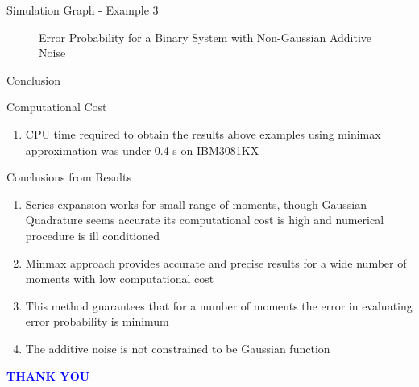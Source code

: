\documentclass{beamer}
\begin{document}
\begin{frame}{Simulation Graph - Example 3}
\begin{figure}
    \caption{Error Probability for a Binary System with Non-Gaussian Additive Noise}
    \label{fig.4}
\end{figure}
\end{frame}
\begin{frame}{Conclusion}
\begin{block}{Computational Cost}
\begin{enumerate}[]
\item CPU time required to obtain the results above examples using minimax approximation was under 
      0.4 s on IBM3081KX
\end{enumerate}
\end{block}

\begin{block}{Conclusions from Results}
\begin{enumerate}[]
\item Series expansion works for small range of moments, though Gaussian Quadrature seems accurate
      its computational cost is high and numerical procedure is ill conditioned
\item Minmax approach provides accurate and precise results for a wide number of moments with low 
      computational cost 
\item This method guarantees that for a number of moments the error in evaluating error probability is 
      minimum
\item The additive noise is not constrained to be Gaussian function
\end{enumerate}
\end{block}
\end{frame}
\begin{frame}
   \centering
    \textcolor{blue}{\Huge{\textbf{THANK YOU}}}
 \begin{figure}
    \label{logo}
\end{figure}  
\end{frame}
\end{document}
